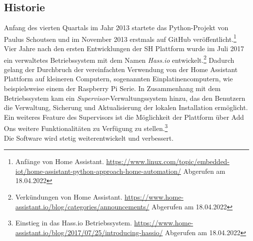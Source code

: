     \subsection*{Historie}
    \label{sec:historyHOAS}
        Anfang des vierten Quartals im Jahr 2013 startete das Python-Projekt von Paulus Schoutsen und im November 2013 erstmals auf GitHub 
        veröffentlicht.\footnote{Anfänge von Home Assistant. \url{https://www.linux.com/topic/embedded-iot/home-assistant-python-approach-home-automation/} Abgerufen am 18.04.2022}
        \\
        \linebreak
        Vier Jahre nach den ersten Entwicklungen der \acl{SH} Plattform wurde im Juli 2017 ein verwaltetes Betriebssystem mit dem Namen 
        \textit{Hass.io} entwickelt.\footnote{Verkündungen von Home Assistant. \url{https://www.home-assistant.io/blog/categories/announcements/} Abgerufen am 18.04.2022} 
        Dadurch gelang der Durchbruch der vereinfachten Verwendung von der Home Assistant Plattform auf kleineren Computern, sogenannten 
        Einplatinencomputern, wie beispielsweise einem der Raspberry Pi Serie. In Zusammenhang mit dem Betriebssystem kam ein 
        \textit{Supervisor}-Verwaltungssystem hinzu, das den Benutzern die Verwaltung, Sicherung und Aktualisierung der lokalen Installation 
        ermöglicht. Ein weiteres Feature des Supervisors ist die Möglichkeit der Plattform über Add Ons weitere Funktionalitäten zu Verfügung zu 
        stellen.\footnote{Einstieg in das Hass.io Betriebssystem. \url{https://www.home-assistant.io/blog/2017/07/25/introducing-hassio/} Abgerufen am 18.04.2022}
        \\
        \linebreak
        Die Software wird stetig weiterentwickelt und verbessert. 



